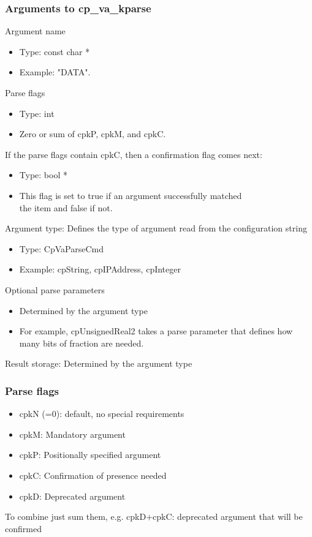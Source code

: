 \documentclass{beamer}
\begin{document}
\begin{frame}
\frametitle{Arguments to cp\_va\_kparse}
Argument name
\begin{itemize}
	\item Type: const char *
	\item Example: "DATA".
\end{itemize}
Parse flags
\begin{itemize}
	\item Type: int
	\item Zero or sum of cpkP, cpkM, and cpkC.
\end{itemize}
If the parse flags contain cpkC, then a confirmation flag comes next:
\begin{itemize}
	\item Type: bool *
	\item This flag is set to true if an argument successfully matched \\the item and false if not.
\end{itemize}
Argument type: Defines the type of argument read from the configuration string
\begin{itemize}
	\item Type: CpVaParseCmd
	\item Example: cpString, cpIPAddress, cpInteger
\end{itemize}
Optional parse parameters
\begin{itemize}
	\item Determined by the argument type
	\item For example, cpUnsignedReal2 takes a parse parameter that defines how many bits of fraction are needed.
\end{itemize}
Result storage: Determined by the argument type
\end{frame}

\begin{frame}[fragile]
\frametitle{Parse flags}
\begin{itemize}
	\item cpkN (=0): default, no special requirements
	\item cpkM: Mandatory argument
	\item cpkP: Positionally specified argument
	\item cpkC: Confirmation of presence needed
	\item cpkD: Deprecated argument
\end{itemize}
To combine just sum them, e.g. cpkD+cpkC: deprecated argument that will be confirmed
\end{frame}
\end{document}
